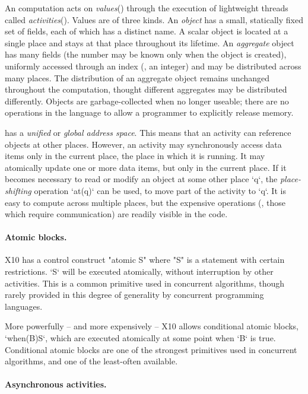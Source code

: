 An \Xten{} computation acts on \emph{values}() through
the execution of lightweight threads called
\emph{activities}(). Values are of three kinds.  
An {\em object}
 has a small, statically fixed set of fields, each of
which has a distinct name. A scalar object is located at a single place and
stays at that place throughout its lifetime. An \emph{aggregate} object has
many fields (the number may be known only when the object is created),
uniformly accessed through an index (\eg, an integer) and may be distributed
across many places. The distribution of an aggregate object remains unchanged
throughout the computation, thought different aggregates may be distributed
differently. Objects are garbage-collected when no longer useable; there are
no operations in the language to allow a programmer to explicitly release
memory.

{}\Xten{} has a \emph{unified} or \emph{global address space}. This means that
an activity can reference objects at other places. However, an activity may
synchronously access data items only in the current place, the place in which
it is running. It may atomically update one or more data items, but only in
the current place.   If it becomes necessary to read or modify an object at
some other place \xcd`q`, the {\em place-shifting} operation \xcd`at(q)` can
be used, to move part of the activity to \xcd`q`.   It is easy to compute
across multiple places, but the expensive operations (\eg, those which require
communication) are readily visible in the code. 

\paragraph{Atomic blocks.}

X10 has a control construct \xcd"atomic S" where \xcd"S" is a statement with
certain restrictions. \xcd`S` will be executed atomically, without
interruption by other activities. This is a common primitive used in
concurrent algorithms, though rarely provided in this degree of generality by
concurrent programming languages.

More powerfully -- and more expensively -- X10 allows conditional atomic
blocks, \xcd`when(B)S`, which are executed atomically at some point when
\xcd`B` is true.  Conditional atomic blocks are one of the strongest
primitives used in concurrent algorithms, and one of the least-often
available. 

\paragraph{Asynchronous activities.}

